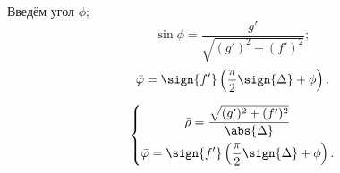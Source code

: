 Введём угол $\phi$;
$$\sin\phi = \frac{g'}{\sqrt{(g')^2 + (f')^2}};$$
$$\bar{\varphi} = \sign{f'}\left(\frac{\pi}{2}\sign{\Delta} + \phi \right).$$

$$\left\{
\begin{gathered}
	\bar{\rho} = \frac{\sqrt{(g')^2 + (f')^2}}{\abs{\Delta}}\\
	\bar{\varphi} = \sign{f'}\left(\frac{\pi}{2}\sign{\Delta} + \phi \right).
\end{gathered}
\right.
$$